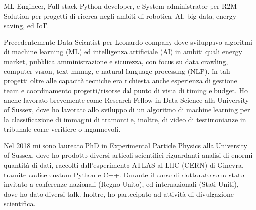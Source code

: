 	
ML Engineer, Full-stack Python developer, e System administrator per R2M Solution per progetti di ricerca negli ambiti di robotica, AI, big data, energy saving, ed IoT.

Precedentemente Data Scientist per Leonardo company dove sviluppavo algoritmi di machine learning (ML) ed intelligenza artificiale (AI) in ambiti quali energy market, pubblica amministrazione e sicurezza, con focus su data crawling, computer vision, text mining, e natural language processing (NLP). In tali progetti oltre alle capacità tecniche era richiesta anche esperienza di gestione team e coordinamento progetti/risorse dal punto di vista di timing e budget. Ho anche lavorato brevemente come Research Fellow in Data Science alla University of Sussex, dove ho lavorato allo sviluppo di un algoritmo di machine learning per la classificazione di immagini di tramonti e, inoltre, di video di testimonianze in tribunale come veritiere o ingannevoli. 

Nel 2018 mi sono laureato PhD in Experimental Particle Physics alla University of Sussex, dove ho prodotto diversi articoli scientifici riguardanti analisi di enormi quantità di dati, raccolti dall'esperimento ATLAS al LHC (CERN) di Ginevra, tramite codice custom Python e C++. Durante il corso di dottorato sono stato invitato a conferenze nazionali (Regno Unito), ed internazionali (Stati Uniti), dove ho dato diversi talk. Inoltre, ho partecipato ad attività di divulgazione scientifica.

